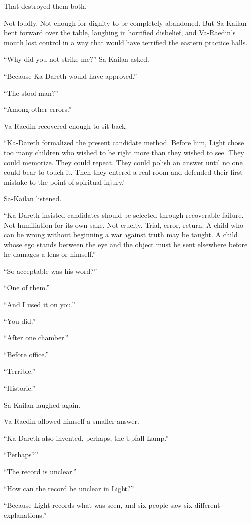That destroyed them both.\par
Not loudly. Not enough for dignity to be completely abandoned. But Sa-Kailan bent forward over the table, laughing in horrified disbelief, and Va-Raedin’s mouth lost control in a way that would have terrified the eastern practice halls.\par
“Why did you not strike me?” Sa-Kailan asked.\par
“Because Ka-Dareth would have approved.”\par
“The stool man?”\par
“Among other errors.”\par
Va-Raedin recovered enough to sit back.\par
“Ka-Dareth formalized the present candidate method. Before him, Light chose too many children who wished to be right more than they wished to see. They could memorize. They could repeat. They could polish an answer until no one could bear to touch it. Then they entered a real room and defended their first mistake to the point of spiritual injury.”\par
Sa-Kailan listened.\par
“Ka-Dareth insisted candidates should be selected through recoverable failure. Not humiliation for its own sake. Not cruelty. Trial, error, return. A child who can be wrong without beginning a war against truth may be taught. A child whose ego stands between the eye and the object must be sent elsewhere before he damages a lens or himself.”\par
“So acceptable was his word?”\par
“One of them.”\par
“And I used it on you.”\par
“You did.”\par
“After one chamber.”\par
“Before office.”\par
“Terrible.”\par
“Historic.”\par
Sa-Kailan laughed again.\par
Va-Raedin allowed himself a smaller answer.\par
“Ka-Dareth also invented, perhaps, the Upfall Lamp.”\par
“Perhaps?”\par
“The record is unclear.”\par
“How can the record be unclear in Light?”\par
“Because Light records what was seen, and six people saw six different explanations.”\par

